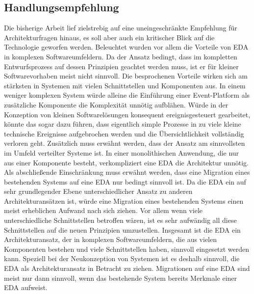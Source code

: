 \subsection{Handlungsempfehlung}
Die bisherige Arbeit lief zielstrebig auf eine uneingeschränkte Empfehlung für Architekturfragen hinaus, es soll aber auch ein kritischer Blick auf die Technologie geworfen werden. 
Beleuchtet wurden vor allem die Vorteile von \ac{EDA} in komplexen Softwareumfeldern. Da der Ansatz bedingt, dass im kompletten Entwurfsprozess auf dessen Prinzipien geachtet werden muss, ist er für kleiner Softwarevorhaben meist nicht sinnvoll. Die besprochenen Vorteile wirken sich am stärksten in Systemen mit vielen Schnittstellen und Komponenten aus. In einem weniger komplexen System würde alleine die Einführung einer Event-Platform als zusätzliche Komponente die Komplexität unnötig aufblähen. Würde in der Konzeption von kleinen Softwarelösungen konsequent ereignisgesteuert gearbeitet, könnte das sogar dazu führen, dass eigentlich simple Prozesse in zu viele kleine technische Ereignisse aufgebrochen werden und die Übersichtlichkeit vollständig verloren geht. 
Zusätzlich muss erwähnt werden, dass der Ansatz am sinnvollsten im Umfeld verteilter Systeme ist. In einer monolithischen Anwendung, die nur aus einer Komponente besteht, verkompliziert eine \ac{EDA} die Architektur unnötig. 
Als abschließende Einschränkung muss erwähnt werden, dass eine Migration eines bestehenden Systems auf eine \ac{EDA} nur bedingt sinnvoll ist. Da die \ac{EDA} ein auf sehr grundlegender Ebene unterschiedlicher Ansatz zu anderen Architekturansätzen ist, würde eine Migration eines bestehenden Systems einen meist erheblichen Aufwand nach sich ziehen. Vor allem wenn viele unterschiedliche Schnittstellen betroffen wären, ist es sehr aufwändig all diese Schnittstellen auf die neuen Prinzipien umzustellen. 
Insgesamt ist die \ac{EDA} ein Architekturansatz, der in komplexen Softwareumfeldern, die aus vielen Komponenten bestehen und viele Schnittstellen haben, sinnvoll eingesetzt werden kann. Speziell bei der Neukonzeption von Systemen ist es deshalb sinnvoll, die \ac{EDA} als Architekturansatz in Betracht zu ziehen. Migrationen auf eine \ac{EDA} sind meist nur dann sinnvoll, wenn das bestehende System bereits Merkmale einer \ac{EDA} aufweist.

